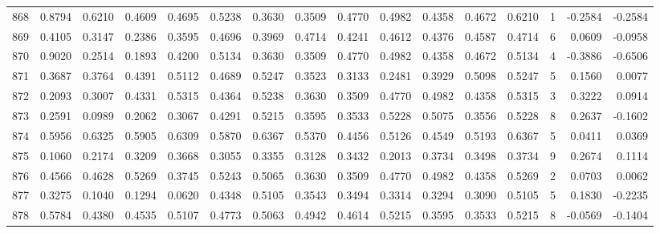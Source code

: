 \begin{tabular}{lrrrrrrrrrrrrrrr}
868 &      0.8794 &  0.6210 &  0.4609 &  0.4695 &  0.5238 &  0.3630 &  0.3509 &  0.4770 &  0.4982 &  0.4358 &   0.4672 &     0.6210 &      1 &                   -0.2584 &                    -0.2584 \\
869 &      0.4105 &  0.3147 &  0.2386 &  0.3595 &  0.4696 &  0.3969 &  0.4714 &  0.4241 &  0.4612 &  0.4376 &   0.4587 &     0.4714 &      6 &                    0.0609 &                    -0.0958 \\
870 &      0.9020 &  0.2514 &  0.1893 &  0.4200 &  0.5134 &  0.3630 &  0.3509 &  0.4770 &  0.4982 &  0.4358 &   0.4672 &     0.5134 &      4 &                   -0.3886 &                    -0.6506 \\
871 &      0.3687 &  0.3764 &  0.4391 &  0.5112 &  0.4689 &  0.5247 &  0.3523 &  0.3133 &  0.2481 &  0.3929 &   0.5098 &     0.5247 &      5 &                    0.1560 &                     0.0077 \\
872 &      0.2093 &  0.3007 &  0.4331 &  0.5315 &  0.4364 &  0.5238 &  0.3630 &  0.3509 &  0.4770 &  0.4982 &   0.4358 &     0.5315 &      3 &                    0.3222 &                     0.0914 \\
873 &      0.2591 &  0.0989 &  0.2062 &  0.3067 &  0.4291 &  0.5215 &  0.3595 &  0.3533 &  0.5228 &  0.5075 &   0.3556 &     0.5228 &      8 &                    0.2637 &                    -0.1602 \\
874 &      0.5956 &  0.6325 &  0.5905 &  0.6309 &  0.5870 &  0.6367 &  0.5370 &  0.4456 &  0.5126 &  0.4549 &   0.5193 &     0.6367 &      5 &                    0.0411 &                     0.0369 \\
875 &      0.1060 &  0.2174 &  0.3209 &  0.3668 &  0.3055 &  0.3355 &  0.3128 &  0.3432 &  0.2013 &  0.3734 &   0.3498 &     0.3734 &      9 &                    0.2674 &                     0.1114 \\
876 &      0.4566 &  0.4628 &  0.5269 &  0.3745 &  0.5243 &  0.5065 &  0.3630 &  0.3509 &  0.4770 &  0.4982 &   0.4358 &     0.5269 &      2 &                    0.0703 &                     0.0062 \\
877 &      0.3275 &  0.1040 &  0.1294 &  0.0620 &  0.4348 &  0.5105 &  0.3543 &  0.3494 &  0.3314 &  0.3294 &   0.3090 &     0.5105 &      5 &                    0.1830 &                    -0.2235 \\
878 &      0.5784 &  0.4380 &  0.4535 &  0.5107 &  0.4773 &  0.5063 &  0.4942 &  0.4614 &  0.5215 &  0.3595 &   0.3533 &     0.5215 &      8 &                   -0.0569 &                    -0.1404 \\

\end{tabular}
